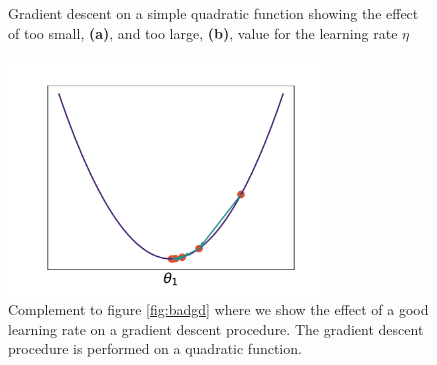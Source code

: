 \begin{figure}[H]
\centering
\hspace*{-0.9in}
\caption{Gradient descent on a simple quadratic function showing the effect of too small, \textbf{(a)}, and too large, \textbf{(b)}, value for the learning rate $\eta$}\label{fig:badgd}
\includegraphics[width=0.75\textwidth]{../figures/gd_good.pdf}
\caption{Complement to figure \ref{fig:badgd} where we show the effect of a good learning rate on a gradient descent procedure. The gradient descent procedure is performed on a quadratic function.}\label{fig:goodgd}
\end{figure}



